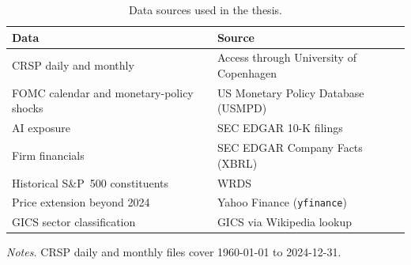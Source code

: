 
\begin{table}[!htbp]
\centering
\caption{Data sources used in the thesis.}
\label{tab:data_sources}
\renewcommand{\arraystretch}{1.4}
\begin{tabular}{ll}
\toprule
\textbf{Data} & \textbf{Source} \\
\midrule
CRSP daily and monthly                     & Access through University of Copenhagen \\
FOMC calendar and monetary-policy shocks   & US Monetary Policy Database (USMPD) \\
AI exposure                                & SEC EDGAR 10-K filings \\
Firm financials                            & SEC EDGAR Company Facts (XBRL) \\
Historical S\&P~500 constituents           & WRDS \\
Price extension beyond 2024                & Yahoo Finance (\texttt{yfinance}) \\
GICS sector classification                 & GICS via Wikipedia lookup \\
\bottomrule
\end{tabular}

\vspace{4pt}
\begin{minipage}{0.85\textwidth}
\footnotesize
\textit{Notes.} CRSP daily and monthly files cover 1960-01-01 to 2024-12-31.
\end{minipage}
\end{table}
